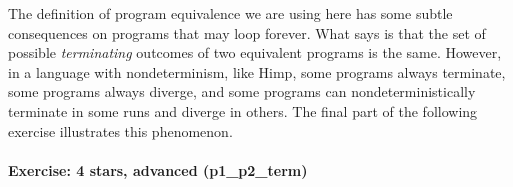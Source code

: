 \documentclass[12pt]{report}
\begin{document}
 The definition of program equivalence we are using here has some
    subtle consequences on programs that may loop forever.  What
     says is that the set of possible \textit{terminating} outcomes
    of two equivalent programs is the same. However, in a language
    with nondeterminism, like Himp, some programs always terminate,
    some programs always diverge, and some programs can
    nondeterministically terminate in some runs and diverge in
    others. The final part of the following exercise illustrates this
    phenomenon.


\paragraph{Exercise: 4 stars, advanced (p1\_p2\_term)}
\end{document}
